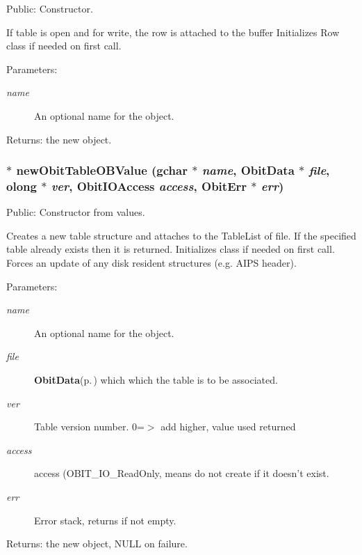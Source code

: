 Public: Constructor. 

If table is open and for write, the row is attached to the buffer Initializes Row class if needed on first call. \begin{Desc}
\item[Parameters:]
\begin{description}
\item[{\em name}]An optional name for the object. \end{description}
\end{Desc}
\begin{Desc}
\item[Returns:]the new object. \end{Desc}
\subsubsection{$\ast$ new\-Obit\-Table\-OBValue (gchar $\ast$ {\em name}, {\bf Obit\-Data} $\ast$ {\em file}, {\bf olong} $\ast$ {\em ver}, Obit\-IOAccess {\em access}, {\bf Obit\-Err} $\ast$ {\em err})}\label{ObitTableOB_8h_a12}


Public: Constructor from values. 

Creates a new table structure and attaches to the Table\-List of file. If the specified table already exists then it is returned. Initializes class if needed on first call. Forces an update of any disk resident structures (e.g. AIPS header). \begin{Desc}
\item[Parameters:]
\begin{description}
\item[{\em name}]An optional name for the object. \item[{\em file}]{\bf Obit\-Data}{\rm (p.\,\pageref{structObitData})} which which the table is to be associated. \item[{\em ver}]Table version number. 0=$>$ add higher, value used returned \item[{\em access}]access (OBIT\_\-IO\_\-Read\-Only, means do not create if it doesn't exist. \item[{\em err}]Error stack, returns if not empty. \end{description}
\end{Desc}
\begin{Desc}
\item[Returns:]the new object, NULL on failure. \end{Desc}
